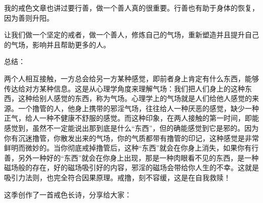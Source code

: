 我的戒色文章也讲过要行善，做一个善人真的很重要。行善也有助于身体的恢复，因为善则升阳。

让我们做一个坚定的戒者，做一个善人，修炼自己的气场，重新塑造并且提升自己的气场，影响并且帮助更多的人。

总结：

两个人相互接触，一方总会给另一方某种感觉，即前者身上肯定有什么东西，能够传达给对方某种信息。这是从心理学角度来理解气场：我们把人们身上的这种东西，这种给别人感觉的东西，称为气场。心理学上的气场就是人们给他人感觉的来源。一个撸管的人，他身上携带的邪淫气场，往往给人一种厌恶的感觉，缺少一种正气，给人一种不健康不舒服的感觉。而这种印象，在两人接触的第一时间，即能感觉到，虽然不一定能说出那到底是什么“东西”，但的确能感觉到它是邪的。因为你有沉迷撸管，你散发出来的气场，你的气质都带有撸管的印记，这种感觉是非常鲜明而微妙的。当你彻底戒掉撸管后，这种“东西”就会在你身上消失，如果你有行善，另外一种好的“东西”就会在你身上出现，那是一种肉眼看不见的东西，是一种磁场般的存在，好的磁场吸引好的内容，邪淫的磁场会带给你人生的不幸。这就是吸引力法则，也完全符合因果原理。戒撸，刻不容缓，这是在自我救赎！

这季创作了一首戒色长诗，分享给大家：

